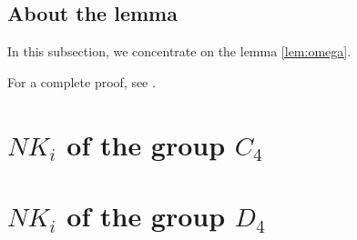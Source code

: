 \subsection{About the lemma}
In this subsection, we concentrate on the lemma \ref{lem:omega}.

For a complete proof, see \cite{MR86f:18017}.

\section{\texorpdfstring{$NK_i$}{NKi} of the group \texorpdfstring{$C_4$}{C4}}
\label{sec:C4}
\section{\texorpdfstring{$NK_i$}{NKi} of the group \texorpdfstring{$D_4$}{D4}}
\label{sec:D4}